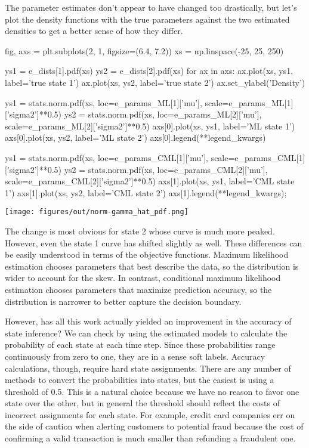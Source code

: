 The parameter estimates don't appear to have changed too drastically, but let's plot the density functions with the true parameters against the two estimated densities to get a better sense of how they differ.

\begin{NotebookIn}
fig, axs = plt.subplots(2, 1, figsize=(6.4, 7.2))
xs = np.linspace(-25, 25, 250)

ys1 = e_dists[1].pdf(xs)
ys2 = e_dists[2].pdf(xs)
for ax in axs:
    ax.plot(xs, ys1, label='true state 1')
    ax.plot(xs, ys2, label='true state 2')
    ax.set_ylabel('Density')

ys1 = stats.norm.pdf(xs,
                     loc=e_params_ML[1]['mu'],
                     scale=e_params_ML[1]['sigma2']**0.5)
ys2 = stats.norm.pdf(xs,
                     loc=e_params_ML[2]['mu'],
                     scale=e_params_ML[2]['sigma2']**0.5)
axs[0].plot(xs, ys1, label='ML state 1')
axs[0].plot(xs, ys2, label='ML state 2')
axs[0].legend(**legend_kwargs)

ys1 = stats.norm.pdf(xs,
                     loc=e_params_CML[1]['mu'],
                     scale=e_params_CML[1]['sigma2']**0.5)
ys2 = stats.norm.pdf(xs,
                     loc=e_params_CML[2]['mu'],
                     scale=e_params_CML[2]['sigma2']**0.5)
axs[1].plot(xs, ys1, label='CML state 1')
axs[1].plot(xs, ys2, label='CML state 2')
axs[1].legend(**legend_kwargs);
\end{NotebookIn}

\begin{NotebookImage}
\texttt{[image: figures/out/norm-gamma\_hat\_pdf.png]}
\end{NotebookImage}

The change is most obvious for state 2 whose curve is much more peaked. However, even the state 1 curve has shifted slightly as well. These differences can be easily understood in terms of the objective functions. Maximum likelihood estimation chooses parameters that best describe the data, so the distribution is wider to account for the skew. In contrast, conditional maximum likelihood estimation chooses parameters that maximize prediction accuracy, so the distribution is narrower to better capture the decision boundary.

However, has all this work actually yielded an improvement in the accuracy of state inference? We can check by using the estimated models to calculate the probability of each state at each time step. Since these probabilities range continuously from zero to one, they are in a sense soft labels. Accuracy calculations, though, require hard state assignments. There are any number of methods to convert the probabilities into states, but the easiest is using a threshold of 0.5. This is a natural choice because we have no reason to favor one state over the other, but in general the threshold should reflect the costs of incorrect assignments for each state. For example, credit card companies err on the side of caution when alerting customers to potential fraud because the cost of confirming a valid transaction is much smaller than refunding a fraudulent one.

